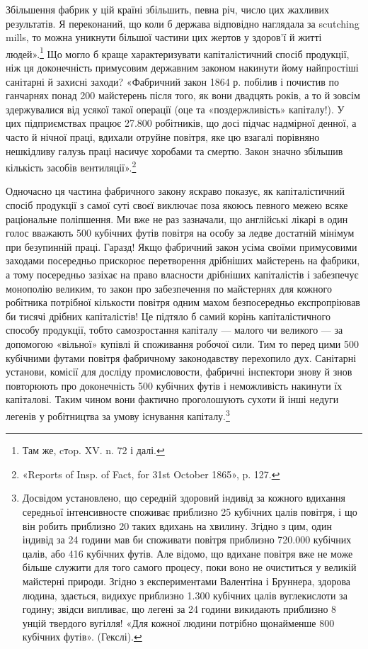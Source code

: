 \parcont{}  %
Збільшення фабрик у цій країні збільшить, певна річ, число цих
жахливих результатів. Я переконаний, що коли б держава відповідно наглядала за
scutching mills, то можна уникнути більшої частини цих жертов у здоров’ї й
житті людей».\footnote{
Там же, cтop. XV. n. 72 і далі.
} Що могло б краще характеризувати капіталістичний спосіб продукції, ніж
ця доконечність примусовим державним законом накинути йому
найпростіші санітарні й захисні заходи? «Фабричний закон 1864 р.
побілив і почистив по ганчарнях понад 200 майстерень після
того, як вони двадцять років, а то й зовсім здержувалися від
усякої такої операції (оце та «поздержливість» капіталу!). У цих
підприємствах працює \num{27.800} робітників, що досі підчас надмірної денної, а
часто й нічної праці, вдихали отруйне повітря,
яке цю взагалі порівняно нешкідливу галузь праці насичує
хоробами та смертю. Закон значно збільшив кількість засобів
вентиляції».\footnote{
«Reports of Insp. of Fact, for 31st October 1865», p. 127.
}

Одночасно ця частина фабричного закону яскраво показує, як
капіталістичний спосіб продукції з самої суті своєї виключає
поза якоюсь певного межею всяке раціональне поліпшення. Ми
вже не раз зазначали, що англійські лікарі в один голос вважають
500 кубічних футів повітря на особу за ледве достатній мінімум
при безупинній праці. Гаразд! Якщо фабричний закон усіма
своїми примусовими заходами посередньо прискорює перетворення дрібніших
майстерень на фабрики, а тому посередньо
зазіхає на право власности дрібніших капіталістів і забезпечує
монополію великим, то закон про забезпечення по майстернях
для кожного робітника потрібної кількости повітря одним махом
безпосередньо експропріював би тисячі дрібних капіталістів!
Це підтяло б самий корінь капіталістичного способу продукції,
тобто самозростання капіталу — малого чи великого — за допомогою «вільної»
купівлі й споживання робочої сили. Тим то
перед цими 500 кубічними футами повітря фабричному законодавству перехопило
дух. Санітарні установи, комісії для досліду промисловости, фабричні інспектори
знову й знов повторюють про доконечність 500
кубічних футів і неможливість накинути їх капіталові.
Таким чином вони фактично проголошують
сухоти й інші недуги легенів у робітництва за умову існування
капіталу.\footnote{
Досвідом установлено, що середній здоровий індивід за кожного
вдихання середньої інтенсивносте споживає приблизно 25 кубічних
цалів  повітря, і що він робить приблизно 20 таких вдихань на хвилину. Згідно з
цим, один індивід за 24 години мав би споживати повітря приблизно \num{720.000}
кубічних цалів, або 416 кубічних футів. Але
відомо, що вдихане повітря вже не може більше служити для того самого
процесу, поки воно не очиститься у великій майстерні природи. Згідно
з експериментами Валентіна і Бруннера, здорова людина, здається, видихує
приблизно \num{1.300} кубічних цалів вуглекислоти за годину; звідси
випливає, що легені за 24 години викидають приблизно 8 унцій твердого
вугілля! «Для кожної людини потрібно щонайменше 800 кубічних
футів». (Гекслі).
}
